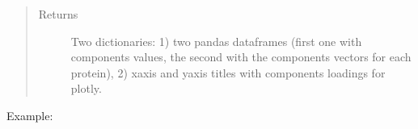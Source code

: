 \documentclass[letterpaper,10pt,english]{sphinxmanual}
\begin{document}
\begin{fulllineitems}
\begin{quote}
\begin{description}
\item[{Returns}] \leavevmode
Two dictionaries: 1) two pandas dataframes (first one with components values, the second with the components vectors for each protein), 2) xaxis and yaxis titles with components loadings for plotly.

\end{description}\end{quote}

Example:

\begin{sphinxVerbatim}[commandchars=\\\{\}]
   \PYG{p}{[} \PYG{p}{]}   
\end{sphinxVerbatim}

\end{fulllineitems}

\end{document}
